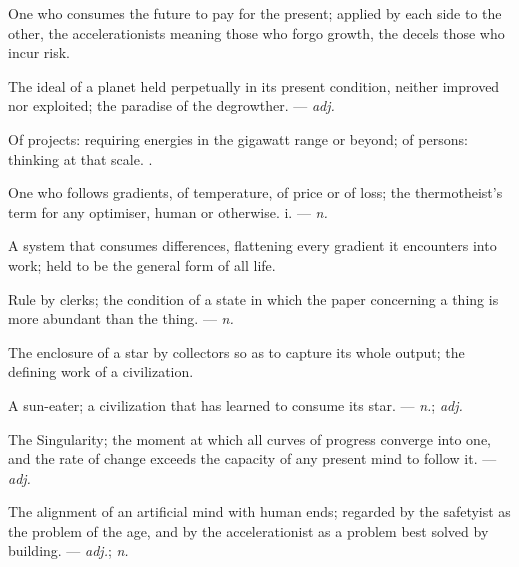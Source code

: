   One who consumes the future to pay for the present; applied by each side to the other, the accelerationists meaning those who forgo growth, the decels those who incur risk.

 The ideal of a planet held perpetually in its present condition, neither improved nor exploited; the paradise of the degrowther. ---  \textit{adj.}

 Of projects: requiring energies in the gigawatt range or beyond; of persons: thinking at that scale. .

 One who follows gradients, of temperature, of price or of loss; the thermotheist's term for any optimiser, human or otherwise.   i. ---  \textit{n.}

 A system that consumes differences, flattening every gradient it encounters into work; held to be the general form of all life.

 Rule by clerks; the condition of a state in which the paper concerning a thing is more abundant than the thing. ---  \textit{n.}

 The enclosure of a star by collectors so as to capture its whole output; the defining work of a  civilization.

 A sun-eater; a civilization that has learned to consume its star. ---  \textit{n.};  \textit{adj.}

 The Singularity; the moment at which all curves of progress converge into one, and the rate of change exceeds the capacity of any present mind to follow it. ---  \textit{adj.}

 The alignment of an artificial mind with human ends; regarded by the safetyist as the problem of the age, and by the accelerationist as a problem best solved by building. ---  \textit{adj.};  \textit{n.}

